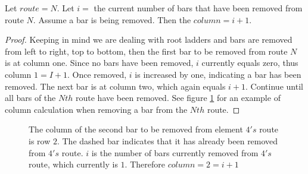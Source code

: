\begin{lemma}
  Let $route=N$. Let $i=$ the current number of bars that have been removed from route $N$. Assume a bar is being removed.
  Then the $column=i+1$.
\end{lemma}
\begin{proof}
  Keeping in mind we are dealing with root ladders and bars are removed from left to right, top to bottom, then the first bar to 
  be removed from route $N$ is at column one. Since no bars have been removed, $i$ currently equals zero, 
  thus column $1=I+1$. Once removed, $i$ is increased by one, indicating a bar has been removed. The next bar is at column two, 
  which again equals $i+1$. Continue until all bars of the $Nth$ route have been removed. See figure \ref{fig:SJTcase4} for an example 
  of column calculation when removing a bar from the $Nth$ route.
\end{proof}

\begin{figure}[!htp]
  \begin{center}
  \end{center}
  \caption{The column of the second bar to be removed from element $4's$ route is row $2$. The dashed bar indicates that it has already been 
  removed from $4's$ route. $i$ is the number of bars currently removed from $4's$ route, which currently is $1$. Therefore $column=2=i+1$}

  \label{fig:SJTcase4}
\end{figure}



